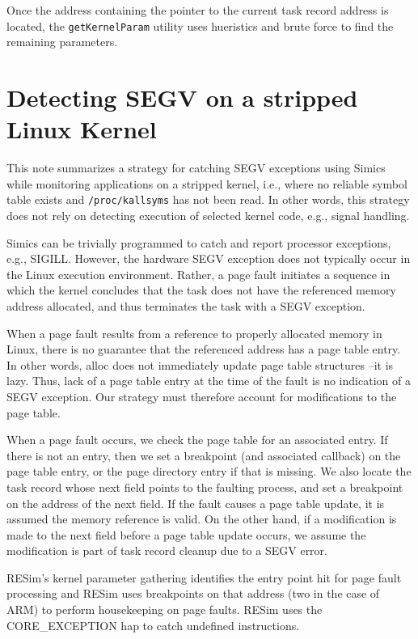 \documentclass[titlepage]{article}
\begin{document}
\begin{appendices}
Once the address containing the pointer to the current task record address is located, the {\tt getKernelParam} utility uses hueristics and brute force to
find the remaining parameters.

\section{Detecting SEGV on a stripped Linux Kernel}
\label{SEGV}
This note summarizes a strategy for catching SEGV exceptions using Simics while monitoring applications on a stripped kernel, i.e., where no reliable symbol table exists and {\tt /proc/kallsyms} has not been read.  In other words, this strategy does not rely on detecting execution of selected kernel code, e.g., signal handling.

Simics can be trivially programmed to catch and report processor exceptions, e.g., SIGILL.  However, the hardware SEGV exception does not typically occur in the Linux execution environment.  Rather, a page fault initiates a sequence in which the kernel concludes that the task does not have the referenced memory address allocated, and thus terminates the task with a SEGV exception.

When a page fault results from a reference to properly allocated memory in Linux, there is no guarantee that the referenced address has a page table entry. In other words, alloc does not immediately update page table structures --it is lazy.  Thus, lack of a page table entry at the time of the fault is no indication of a SEGV exception.  Our strategy must therefore account for modifications to the page table.

When a page fault occurs, we check the page table for an associated entry. If there is not an entry, then we set a breakpoint (and associated callback) on the page table entry, or the page directory entry if that is missing.  We also locate the task record whose next field points to the faulting process, and set a breakpoint on the address of the next field.  If the fault causes a page table update, it is assumed the memory reference is valid.  On the other hand, if a modification is made to the next field before a page table update occurs, we assume the modification is part of task record cleanup due to a SEGV error.

RESim's kernel parameter gathering identifies the entry point hit for page fault processing and RESim uses breakpoints on that address (two in the case of ARM) to perform housekeeping on
page faults.  RESim uses the CORE\_EXCEPTION hap to catch undefined instructions.


\end{appendices}
\end{document}
